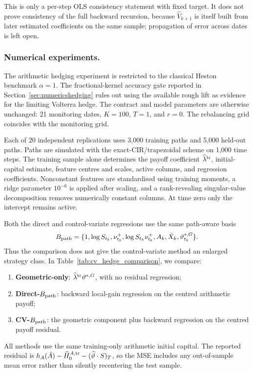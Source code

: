 \documentclass[10pt,a4paper,reqno]{amsart}
\theoremstyle{plain}
\theoremstyle{definition}
\theoremstyle{remark}
\theoremstyle{example}
\begin{document}
This is only a per-step OLS consistency statement with fixed target. It does not prove consistency of the full backward recursion, because $\hat V_{k+1}$ is itself built from later estimated coefficients on the same sample; propagation of error across dates is left open.

\subsubsection*{Numerical experiments.}
 The arithmetic hedging experiment is restricted to the classical Heston benchmark
\(\alpha=1\).  The fractional-kernel accuracy gate reported in
Section~\ref{sec:numericshedging}  rules out using the available rough lift as evidence for the
limiting Volterra hedge.  The contract and model parameters are otherwise unchanged: 21 monitoring
dates, \(K=100\), \(T=1\), and \(r=0\).  The rebalancing grid coincides with the monitoring grid.

 Each of 20 independent replications uses 3,000 training paths and 5,000 held-out paths.  Paths are
simulated with the exact-CIR/trapezoidal scheme on 1,000 time steps.  The training sample alone
determines the payoff coefficient \(\widehat\lambda^{\rm tr}\), initial-capital estimate, feature
centres and scales, active columns, and regression coefficients.  Nonconstant features are
standardised using training moments, a ridge parameter \(10^{-6}\) is applied after scaling, and a
rank-revealing singular-value decomposition removes numerically constant columns.  At time zero
only the intercept remains active.

Both the direct and control-variate regressions use the same path-aware basis
\[
 B_{\rm path}=\{1,\log S_{t_k},\nu_{t_k}^+,\log S_{t_k}\nu_{t_k}^+,
                  A_k,\bar X_k,\vartheta_{t_k}^{*,G}\}.
\]
Thus the comparison does not give the control-variate method an enlarged strategy class.  In Table~\ref{tab:cv_hedge_comparison}, we
compare:
\begin{enumerate}[label=\emph{(\roman*)}, leftmargin=*]
  \item \textbf{Geometric-only}: \(\widehat\lambda^{\rm tr}\vartheta^{*,G}\), with no
  residual regression;
  \item \textbf{Direct-\(B_{\rm path}\)}: backward local-gain regression on the centred
  arithmetic payoff;
  \item \textbf{CV-\(B_{\rm path}\)}: the geometric component plus backward regression
  on the centred payoff residual.
\end{enumerate}
 All methods use the same training-only arithmetic initial capital.  The reported residual is
\(h_A(\bar A)-\widehat H_0^{A,\rm tr}-(\widehat\vartheta\cdot S)_T\), so the MSE includes any
out-of-sample mean error rather than silently recentering the test sample.
\end{document}

